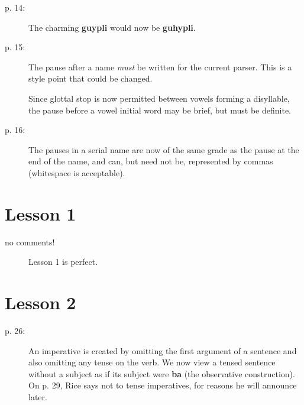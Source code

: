\documentclass[12pt]{article}
\begin{document}
\begin{description}
\item[p. 14:]  The charming {\bf guypli} would now be {\bf guhypli}.

\item[p. 15:]  The pause after a name {\em must\/} be written for the current parser.  This is a style point that could be changed.

Since glottal stop is now permitted between vowels forming a disyllable, the pause before a vowel initial word may be brief, but must be definite.

\item[p. 16:]  The pauses in a serial name are now of the same grade as the pause at the end of the name, and can, but need not be, represented by commas (whitespace is acceptable).

\end{description}

\section{Lesson 1}

\begin{description}

\item[no comments!]  Lesson 1 is perfect.

\end{description}

\section{Lesson 2}

\begin{description}

\item[p. 26:]  An imperative is created by omitting the first argument of a sentence and also omitting any tense on the verb.  We now view a tensed sentence without a subject as if its subject were {\bf ba} (the observative construction).  On p. 29, Rice says not to tense imperatives, for reasons he will announce later.

\end{description}
\end{document}
